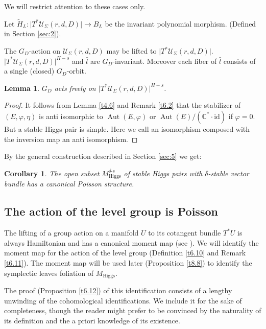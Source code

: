 \documentclass[12pt,a4paper,oneside,english]{smfart}
\newtheorem{cor}[thm]{Corollary}
\newtheorem{lem}[thm]{Lemma}
\theoremstyle{definition}
\theoremstyle{remark}
\DeclareMathOperator{\Aut}{Aut}
\newcommand{\Hig}{\mathrm{Higgs}}
\newcommand{\MH}{M_{\Hig}}
\newcommand{\MHds}{M^{\delta\text{-}s}_{\Hig}}
\newcommand{\cU}{\mathcal{U}}
\newcommand{\lbar}{\bar{l}}
\newcommand{\tot}[1]{\lvert #1 \rvert}
\newcommand{\HL}{\widetilde{H}_{L}}
\begin{document}
We will restrict attention to these cases only.

Let $\HL \colon \tot{T^*\cU_\Sigma(r, d, D)} \to B_L$ be the invariant polynomial morphism. (Defined in Section \ref{sec:2}).

The $G_D$-action on $\cU_\Sigma(r, d, D)$ may be lifted to $\tot{T^*\cU_\Sigma(r, d, D)}$. $\tot{T^*\cU_\Sigma(r, d, D)}^{H-s}$ and $\lbar$ are $G_D$-invariant. Moreover each fiber of $\lbar$ consists of a single (closed) $G_D$-orbit.

\begin{lem}\label{t6.7}
$G_D$ acts freely on $\tot{T^*\cU_\Sigma(r, d, D)}^{H-s}$.
\end{lem}

\begin{proof}
It follows from Lemma \ref{t4.6} and Remark \ref{t6.2} that the stabilizer of $(E, \varphi, \eta)$ is anti isomorphic to $\Aut(E, \varphi)$ or $\Aut(E)/(\mathbb{C}^* \cdot \mathrm{id})$ if $\varphi = 0$. But a stable Higgs pair is simple. Here we call an isomorphism composed with the inversion map an anti isomorphism.
\end{proof}

By the general construction described in Section \ref{sec:5} we get:

\begin{cor}\label{t6.8}
The open subset $\MHds$ of stable Higgs pairs with $\delta$-stable vector bundle has a canonical Poisson structure.
\end{cor}

\subsection{The action of the level group is Poisson}\label{sec:6.2}

The lifting of a group action on a manifold $U$ to its cotangent bundle $T^*U$ is always Hamiltonian and has a canonical moment map (see \cite{A-G}). We will identify the moment map for the action of the level group (Definition \ref{t6.10} and Remark \ref{t6.11}). The moment map will be used later (Proposition \ref{t8.8}) to identify the symplectic leaves foliation of $\MH$.

The proof (Proposition \ref{t6.12}) of this identification consists of a lengthy unwinding of the cohomological identifications. We include it for the sake of completeness, though the reader might prefer to be convinced by the naturality of its definition and the a priori knowledge of its existence.
\end{document}
